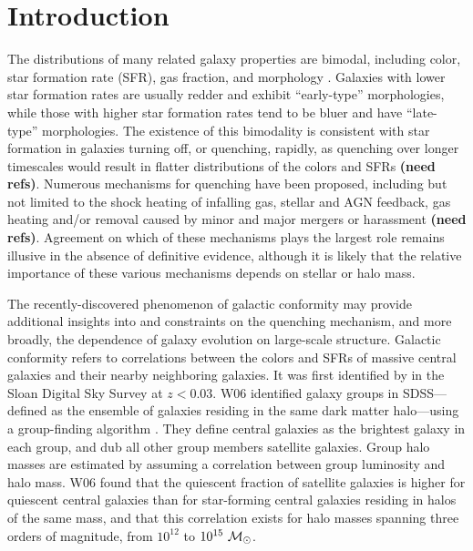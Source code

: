 
\section{Introduction}\label{sec:intro}


The distributions of many related galaxy properties are bimodal, including color, star formation rate (SFR), gas fraction, and morphology
\citep{Strateva01, Kauffmann03, Baldry04, Balogh04a, Balogh04b}.
Galaxies with lower star formation rates are usually redder and exhibit ``early-type'' morphologies, while those with higher star formation rates tend to be bluer and have ``late-type'' morphologies.
The existence of this bimodality is consistent with star formation in galaxies turning off, or quenching, rapidly, as quenching over longer timescales would result in flatter distributions of the colors and SFRs {\bf(need refs)}.
Numerous mechanisms for quenching have been proposed, including but not limited to the shock heating of infalling gas, stellar and AGN feedback, gas heating and/or removal caused by minor and major mergers or harassment {\bf(need refs)}.
Agreement on which of these mechanisms plays the largest role remains illusive in the absence of definitive evidence, although it is likely that the relative importance of these various mechanisms depends on stellar or halo mass.

The recently-discovered phenomenon of galactic conformity may provide additional insights into and constraints on the quenching mechanism, and more broadly, the dependence of galaxy evolution on large-scale structure.
Galactic conformity refers to correlations between the colors and SFRs of massive central galaxies and their nearby neighboring galaxies.
It was first identified by \citet[][hereafter W06]{Weinmann06} in the Sloan Digital Sky Survey \citep[SDSS;][]{York00} at $z<0.03$.
W06 identified galaxy groups in SDSS---defined as the ensemble of galaxies residing in the same dark matter halo---using a group-finding algorithm \citep{Yang05a}.
They define central galaxies as the brightest galaxy in each group, and dub all other group members satellite galaxies.
Group halo masses are estimated by assuming a correlation between group luminosity and halo mass.
W06 found that the quiescent fraction of satellite galaxies is higher for quiescent central galaxies than for star-forming central galaxies residing in halos of the same mass, and that this correlation exists for halo masses spanning three orders of magnitude, from $10^{12}$ to $10^{15}~\msun$.

